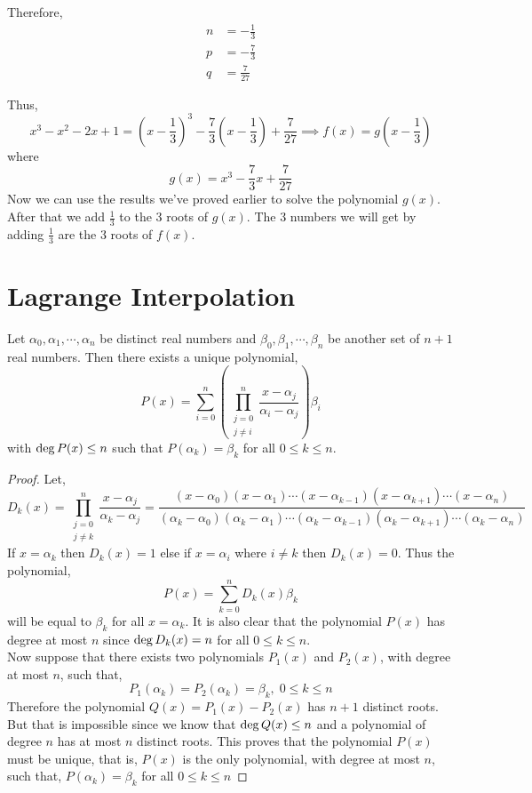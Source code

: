Therefore,
\begin{align*}
   n &= -\frac{1}{3} \\
   p &= -\frac{7}{3}\\
   q &=  \frac{7}{27}
\end{align*}

Thus,
\[
    x^{3} - x^{2} -2x +1 = \left(x - \frac{1}{3}\right)^{3} -\frac{7}{3}\left(x - \frac{1}{3}\right) +\frac{7}{27} \implies f(x) = g\left(x - \frac{1}{3}\right)
\]
where \[ g(x) = x^{3} - \frac{7}{3}x + \frac{7}{27} \]
Now we can use the results we've proved earlier to solve the polynomial $g(x)$. After that we add $\frac{1}{3}$ to the 3 roots 
of $g(x)$. The 3 numbers we will get by adding $\frac{1}{3}$ are the 3 roots of $f(x)$.

\section{Lagrange Interpolation}

\begin{theorem}\label{thm:lagrange-interpol}
    Let $\alpha_{0}, \alpha_{1},\cdots , \alpha_{n}$ be distinct real numbers and 
    $\beta_{0}, \beta_{1}, \cdots, \beta_{n}$ be another set of $n+1$ real numbers. 
    Then there exists a unique polynomial,
    \[
    P(x) = \sum_{i=0}^{n} \left( \prod_{\substack{j=0\\ j\neq i}}^{n} \frac{x - \alpha_{j}}{\alpha_{i} - \alpha_{j}} \right) \beta_{i}
    \]
    with $\operatorname{deg} P(x) \leq n$ such that $P(\alpha_{k}) = \beta_{k}$ for all $0\leq k \leq n$.
\end{theorem}
\begin{proof}
    Let,
    \[
    D_{k}(x) = \prod_{\substack{j=0 \\ j\neq k}}^{n} \frac{x - \alpha_{j}}{\alpha_{k} - \alpha_{j}} = 
    \frac{(x-\alpha_{0})(x-\alpha_{1})\cdots (x - \alpha_{k-1})(x - \alpha_{k+1}) \cdots (x - \alpha_{n})}
         {(\alpha_{k}-\alpha_{0})(\alpha_{k}-\alpha_{1})\cdots (\alpha_{k} - \alpha_{k-1})(\alpha_{k} - \alpha_{k+1}) \cdots (\alpha_{k} - \alpha_{n})}
    \]
    If $x=\alpha_k$ then $D_k(x) = 1$ else if $x=\alpha_i$ where 
    $i \neq k$ then $D_k(x)=0$. Thus the polynomial,
    \[ P(x) = \sum_{k=0}^n D_k(x) \beta_k \]
    will be equal to $\beta_k$ for all $x=\alpha_k$. It is also clear that the 
    polynomial $P(x)$ has degree at most $n$ since $\operatorname{deg} D_k(x)=n$ for all 
    $0 \leq k \leq n$. \\
    Now suppose that there exists two polynomials $P_1(x)$ and $P_2(x)$, with degree at 
    most $n$, such that,
    \[ P_1(\alpha_k) = P_2(\alpha_k) = \beta_k, \; 0\leq k \leq n\]
    Therefore the polynomial $Q(x) = P_1(x) - P_2(x)$ has $n+1$ distinct roots. 
    But that is impossible since we know that $\operatorname{deg} Q(x) \leq n$ and 
    a polynomial of degree $n$ has at most $n$ distinct roots. This proves that 
    the polynomial $P(x)$ must be unique, that is, $P(x)$ is the only polynomial, with 
    degree at most $n$, such that, 
    $P(\alpha_k) = \beta_k$ for all $0 \leq k \leq n$
\end{proof}

